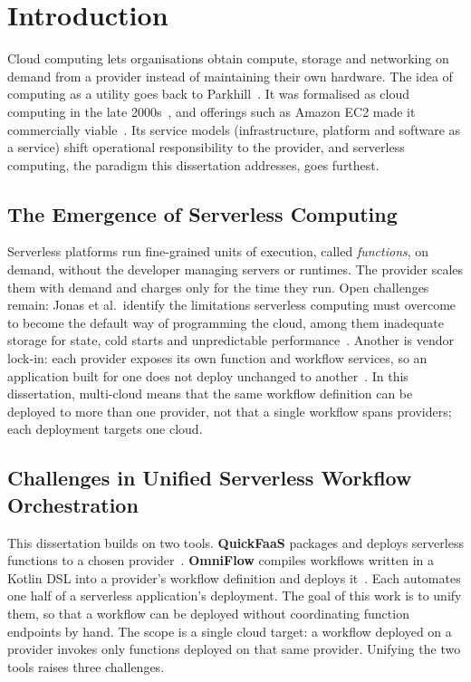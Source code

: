 \chapter{Introduction}
\label{cha:introduction}


Cloud computing lets organisations obtain compute, storage and networking on demand from a
provider instead of maintaining their own hardware. The idea of computing as a utility goes back
to Parkhill~\cite{parkhill1966challenge}. It was formalised as cloud computing in the late
2000s~\cite{vaquero2008breaks,buyya2009cloud,armbrust2010view}, and offerings such as Amazon EC2
made it commercially viable~\cite{armbrust2010view}. Its service models
(infrastructure, platform and software as a service) shift operational responsibility to the
provider, and serverless computing, the paradigm this dissertation addresses, goes furthest.

\section{The Emergence of Serverless Computing}
\label{sec:int_eme_ser_eve_dri_arc}

Serverless platforms run fine-grained units of execution, called \textit{functions}, on demand,
without the developer managing servers or runtimes. The provider scales them with demand and
charges only for the time they run. Open challenges remain: Jonas et al.\ identify the
limitations serverless computing must overcome to become the default way of programming the
cloud, among them inadequate storage for state, cold starts and unpredictable
performance~\cite{jonas2019cloudProgramming}. Another is vendor lock-in: each provider exposes its own
function and workflow services, so an application built for one does not deploy unchanged to
another~\cite{rodrigues2022quickfaas,costa2023omniflow}. In this dissertation, multi-cloud means
that the same workflow definition can be deployed to more than one provider, not that a single
workflow spans providers; each deployment targets one cloud.

\section{Challenges in Unified Serverless Workflow Orchestration}
\label{sec:int_cha_int_uni_multi}

This dissertation builds on two tools. \textbf{QuickFaaS} packages and deploys serverless
functions to a chosen provider~\cite{rodrigues2022quickfaas}. \textbf{OmniFlow} compiles
workflows written in a Kotlin DSL into a provider's workflow definition and deploys
it~\cite{costa2023omniflow}. Each automates one half of a serverless application's deployment. The
goal of this work is to unify them, so that a workflow can be deployed without coordinating
function endpoints by hand. The scope is a single cloud target: a workflow deployed on a provider
invokes only functions deployed on that same provider. Unifying the two tools raises three
challenges.

